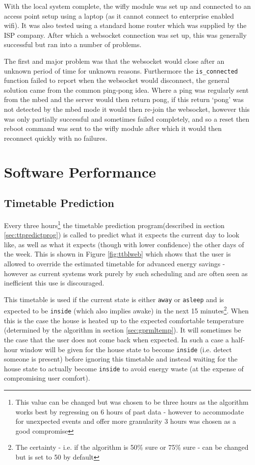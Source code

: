 \documentclass[10.5pt,a4paper,twoside]{report}   %
\begin{document}
With the local system complete, the wifly module was set up and connected to an access point setup using a laptop (as it cannot connect to enterprise enabled wifi). It was also tested using a standard home router which was supplied by the ISP company. After which a websocket connection was set up, this was generally successful but ran into a number of problems.

The first and major problem was that the websocket would close after an unknown period of time for unknown reasons. Furthermore the \verb+is_connected+ function failed to report when the websocket would disconnect, the general solution came from the common ping-pong idea. Where a ping was regularly sent from the mbed and the server would then return pong, if this return ‘pong’ was not detected by the mbed mode it would then re-join the websocket, however this was only partially successful and sometimes failed completely, and so a reset then reboot command was sent to the wifly module after which it would then reconnect quickly with no failures.


\section{Software Performance}
\subsection{Timetable Prediction}
Every three hours\footnote{This value can be changed but was chosen to be three hours as the algorithm works best by regressing on 6 hours of past data - however to accommodate for unexpected events and offer more granularity 3 hours was chosen as a good compromise} the timetable prediction program(described in section \ref{sec:ttpredictprog}) is called to predict what it expects the current day to look like, as well as what it expects (though with lower confidence) the other days of the week.  This is shown in Figure \ref{fig:ttblweb} which shows that the user is allowed to override the estimated timetable for advanced energy savings - however  as current systems work purely by such scheduling and are often seen as inefficient this use is discouraged.

This timetable is used if the current state is either \verb+away+ or \verb+asleep+ and is expected to be \verb+inside+ (which also implies awake) in the next 15 minutes\footnote{The certainty - i.e. if the algorithm is 50\% sure or 75\% sure - can be changed but is set to 50 by default}. When this is the case the house is heated up to the expected comfortable temperature (determined by the algorithm in section \ref{sec:gprmltemp}). It will sometimes be the case that the user does not come back when expected. In such a case a half-hour window will be given for the house state to become \verb+inside+ (i.e. detect someone is present) before ignoring this timetable and instead waiting for the house state to actually become \verb+inside+ to avoid energy waste (at the expense of compromising user comfort).
\end{document}
